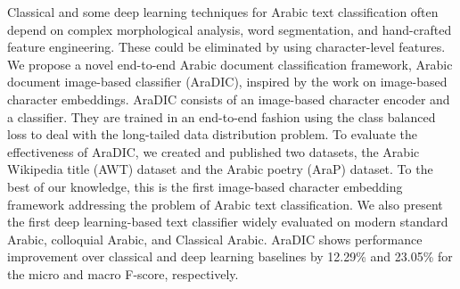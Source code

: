 Classical and some deep learning techniques for Arabic text classification often depend on complex morphological analysis, word segmentation, and hand-crafted feature engineering. These could be eliminated by using character-level features. We propose a novel end-to-end Arabic document classification framework, Arabic document image-based classifier (AraDIC), inspired by the work on image-based character embeddings. AraDIC consists of an image-based character encoder and a classifier. They are trained in an end-to-end fashion using the class balanced loss to deal with the long-tailed data distribution problem. To evaluate the effectiveness of AraDIC, we created and published two datasets, the Arabic Wikipedia title (AWT) dataset and the Arabic poetry (AraP) dataset. To the best of our knowledge, this is the first image-based character embedding framework addressing the problem of Arabic text classification. We also present the first deep learning-based text classifier widely evaluated on modern standard Arabic, colloquial Arabic, and Classical Arabic. AraDIC shows performance improvement over classical and deep learning baselines by 12.29\% and 23.05\% for the micro and macro F-score, respectively.
